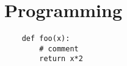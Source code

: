 \chapter{Programming}\label{chap:programming}

\begin{lstlisting}
    def foo(x):
        # comment
        return x*2
\end{lstlisting}

%